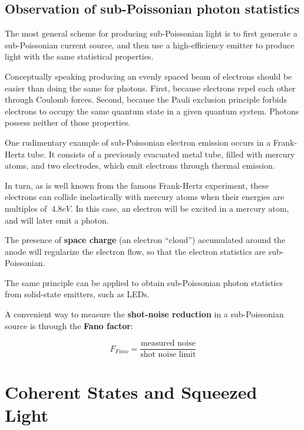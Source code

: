 \documentclass[12pt,a4paper]{report}
\begin{document}
\subsection{Observation of sub-Poissonian photon statistics}

The most general scheme for producing sub-Poissonian light is to first generate a sub-Poissonian current source, and then use a high-efficiency emitter to produce light with the same statistical properties.

Conceptually speaking producing an evenly spaced beam of electrons should be easier than doing the same for photons. First, because electrons repel each other through Coulomb forces. Second, because the Pauli exclusion principle forbids electrons to occupy the same quantum state in a given quantum system. Photons possess neither of those properties.

One rudimentary example of sub-Poissonian electron emission occurs in a Frank-Hertz tube. It consists of a previously evacuated metal tube, filled with mercury atoms, and two electrodes, which emit electrons through thermal emission.

In turn, as is well known from the famous Frank-Hertz experiment, these electrons can collide inelastically  with mercury atoms when their energies are multiples of $~4.8 eV$. In this case, an electron will be excited in a  mercury atom, and will later emit a photon.

The presence of \textbf{space charge} (an electron ``cloud'') accumulated around the anode will regularize the electron flow, so that the electron statistics are sub-Poissonian.


The same principle can be applied to obtain sub-Poissonian photon statistics from solid-state emitters, such as LEDs.

A convenient way to measure the \textbf{shot-noise reduction} in a sub-Poissonian source is through the \textbf{Fano factor}:

\begin{equation}
    F_{Fano}=\frac{\text{measured noise}}{\text{shot noise limit}}
\end{equation}



\section{Coherent States and Squeezed Light}
\end{document}
